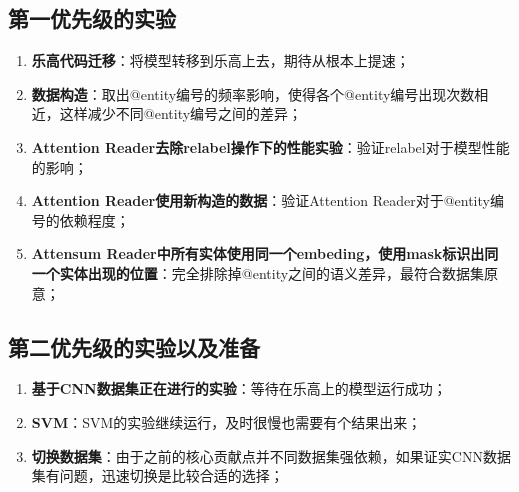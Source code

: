 \documentclass[11pt]{article}
\begin{document}
\subsection{第一优先级的实验}
\begin{enumerate}
    \item  {\bf  乐高代码迁移}：将模型转移到乐高上去，期待从根本上提速；
    \item  {\bf  数据构造}：取出@entity编号的频率影响，使得各个@entity编号出现次数相近，这样减少不同@entity编号之间的差异；
    \item  {\bf  Attention Reader去除relabel操作下的性能实验}：验证relabel对于模型性能的影响；
    \item  {\bf  Attention Reader使用新构造的数据}：验证Attention Reader对于@entity编号的依赖程度；
    \item  {\bf  Attensum Reader中所有实体使用同一个embeding，使用mask标识出同一个实体出现的位置}：完全排除掉@entity之间的语义差异，最符合数据集原意；
\end{enumerate}

\subsection{第二优先级的实验以及准备}
\begin{enumerate}
    \item  {\bf  基于CNN数据集正在进行的实验}：等待在乐高上的模型运行成功；
    \item  {\bf  SVM}：SVM的实验继续运行，及时很慢也需要有个结果出来；
    \item  {\bf 切换数据集}：由于之前的核心贡献点并不同数据集强依赖，如果证实CNN数据集有问题，迅速切换是比较合适的选择；
\end{enumerate}
 
\end{document}
